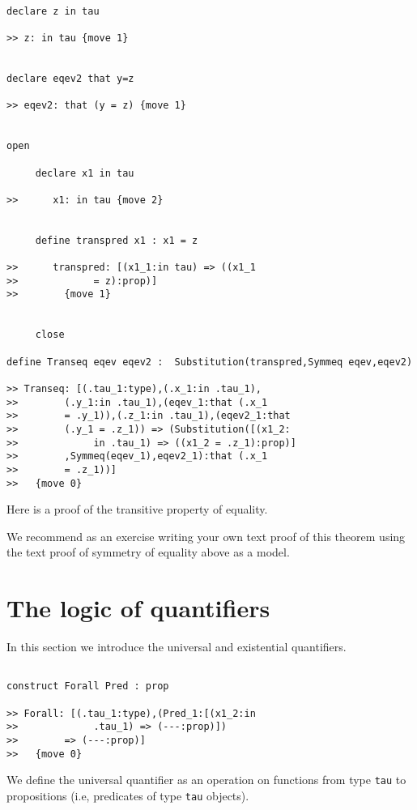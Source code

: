 \documentclass[12pt]{article}
\begin{document}
\begin{verbatim}

declare z in tau

>> z: in tau {move 1}


declare eqev2 that y=z

>> eqev2: that (y = z) {move 1}


open

     declare x1 in tau

>>      x1: in tau {move 2}


     define transpred x1 : x1 = z

>>      transpred: [(x1_1:in tau) => ((x1_1 
>>             = z):prop)]
>>        {move 1}


     close

define Transeq eqev eqev2 :  Substitution(transpred,Symmeq eqev,eqev2)

>> Transeq: [(.tau_1:type),(.x_1:in .tau_1),
>>        (.y_1:in .tau_1),(eqev_1:that (.x_1 
>>        = .y_1)),(.z_1:in .tau_1),(eqev2_1:that 
>>        (.y_1 = .z_1)) => (Substitution([(x1_2:
>>             in .tau_1) => ((x1_2 = .z_1):prop)]
>>        ,Symmeq(eqev_1),eqev2_1):that (.x_1 
>>        = .z_1))]
>>   {move 0}

\end{verbatim}

Here is a proof of the transitive property of equality.

We recommend as an exercise writing your own text proof of this theorem using the text proof of symmetry of equality above as a model.

\section{The logic of quantifiers}

In this section we introduce the universal and existential quantifiers.

\begin{verbatim}

construct Forall Pred : prop

>> Forall: [(.tau_1:type),(Pred_1:[(x1_2:in 
>>             .tau_1) => (---:prop)])
>>        => (---:prop)]
>>   {move 0}

\end{verbatim}

We define the universal quantifier as an operation on functions from type {\tt tau} to propositions (i.e, predicates of type {\tt tau} objects).
\end{document}
